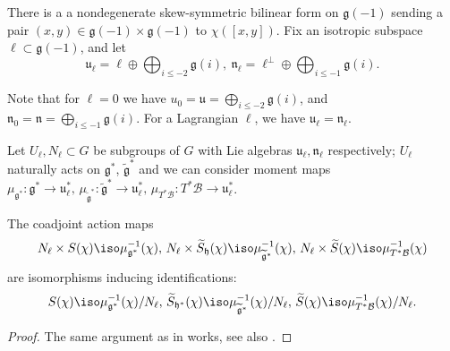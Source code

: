 \documentclass[12pt]{amsart}
\begin{document}
    
    There is a a nondegenerate skew-symmetric bilinear form  on $\mathfrak{g}(-1)$ sending a pair $(x,y) \in \mathfrak{g}(-1) \times \mathfrak{g}(-1)$ to $\chi([x,y])$. Fix an isotropic subspace $\ell \subset \mathfrak{g}(-1)$, and let 
    \begin{equation*}
    \mathfrak{u}_\ell=\ell \oplus \bigoplus_{i \leqslant -2}  \mathfrak{g}(i),
    ~\mathfrak{n}_{\ell}=\ell^{\perp} \oplus \bigoplus_{i \leqslant -1}  \mathfrak{g}(i).
    \end{equation*}
    \begin{rmk}
     Note that for $\ell=0$ we have $u_{0}=\mathfrak{u}=\bigoplus_{i \leqslant -2}  \mathfrak{g}(i)$, and $\mathfrak{n}_{0}=\mathfrak{n}=\bigoplus_{i \leqslant -1}  \mathfrak{g}(i)$. For a Lagrangian $\ell$, we have $\mathfrak{u}_{\ell}=\mathfrak{n}_{\ell}$.   
    \end{rmk}

    Let $U_{\ell}, N_{\ell} \subset G$ be subgroups of $G$ with Lie algebras $\mathfrak{u}_{\ell}, \mathfrak{n}_{\ell}$ respectively; $U_\ell$ naturally acts on $\mathfrak{g}^*$, $\widetilde{\mathfrak{g}}^*$ and we can consider moment maps
    $\mu_{\mathfrak{g}^*}\colon \mathfrak{g}^* \rightarrow \mathfrak{u}_{\ell}^*,\, \mu_{\widetilde{\mathfrak{g}}^*}\colon \widetilde{\mathfrak{g}}^* \rightarrow  \mathfrak{u}_{\ell}^*,\, \mu_{T^*\mathcal{B}}\colon T^*\mathcal{B} \rightarrow \mathfrak{u}_\ell^*$.  


    \begin{prop}\label{prop_realiz_S_as_Ham_red}
    The coadjoint action maps 
    \begin{equation*}
    N_\ell \times S(\chi) \iso \mu^{-1}_{\mathfrak{g}^*}(\chi),\,  N_\ell \times \widetilde{S}_{\mathfrak{h}}(\chi) \iso \mu^{-1}_{\widetilde{\mathfrak{g}}^*}(\chi),\, N_\ell \times \widetilde{S}(\chi) \iso \mu_{T^*\mathcal{B}}^{-1}(\chi)
    \end{equation*}
    are isomorphisms inducing identifications:
    \begin{equation*}
    S(\chi) \iso \mu_{\mathfrak{g}^*}^{-1}(\chi)/N_\ell,\, \widetilde{S}_{\mathfrak{h}^*}(\chi) \iso \mu_{\widetilde{\mathfrak{g}}^*}^{-1}(\chi)/N_\ell,\, \widetilde{S}(\chi) \iso \mu_{T^*\mathcal{B}}^{-1}(\chi)/N_\ell. 
    \end{equation*}
    \end{prop}
    \begin{proof}
    The same argument as in \cite[Lemma 2.1]{GanGinzburg} works, see also  \cite{Losev_isofquant}.
    \end{proof}
\end{document}

